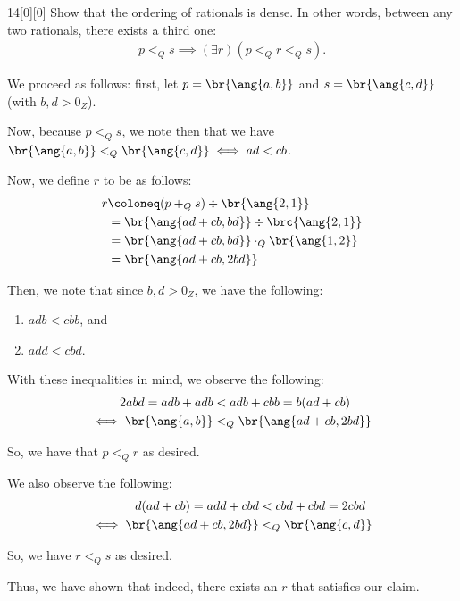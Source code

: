 \documentclass{article}
\begin{document}
\begin{hw}{14}[0][0]
	Show that the ordering of rationals is dense. In other words, between any two rationals, there exists a third one:
	\begin{align*}
		p <_{Q} s \implies (\exists r)(p <_{Q} r <_{Q} s).
	\end{align*}
\end{hw}
\begin{solution}
	We proceed as follows: first, let $p = \br{\ang{a,b}}$ and $s = \br{\ang{c,d}}$ (with $b,d > 0_{Z}$).
	
	Now, because $p <_{Q} s$, we note then that we have $\br{\ang{a,b}} <_{Q} \br{\ang{c,d}} \iff ad < cb$.
	
	Now, we define $r$ to be as follows:
	\begin{align*}
		r &\coloneq (p +_{Q} s) \div \br{\ang{2,1}} \\
		&= \br{\ang{ad+cb, bd}} \div \brc{\ang{2,1}} \\
		&= \br{\ang{ad+cb, bd}} \cdot_{Q} \br{\ang{1,2}} \\
		&= \br{\ang{ad+cb, 2bd}}
	\end{align*}

	Then, we note that since $b,d > 0_{Z}$, we have the following:
	\begin{enumerate}
		\item $adb < cbb$, and
		\item $add < cbd$.
	\end{enumerate}

	With these inequalities in mind, we observe the following:
	\begin{align*}
		2abd = adb + adb &< adb + cbb = b(ad+cb) \\
		\iff \br{\ang{a,b}} &<_{Q} \br{\ang{ad+cb, 2bd}}
	\end{align*}

	So, we have that $p <_{Q} r$ as desired.
	
	We also observe the following:
	\begin{align*}
		d(ad+cb) = add + cbd &< cbd + cbd = 2cbd \\
		\iff \br{\ang{ad+cb, 2bd}} &<_{Q} \br{\ang{c,d}}
	\end{align*}

	So, we have $r <_{Q} s$ as desired.
	
	Thus, we have shown that indeed, there exists an $r$ that satisfies our claim.
\end{solution}
\end{document}
